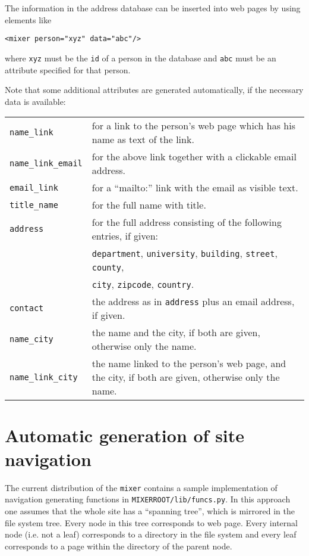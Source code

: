 \documentclass[a4paper,11pt]{article}
\newcommand{\mixer}{\texttt{mixer}}
\newcommand{\MIXERROOT}{\texttt{MIXERROOT}}
\begin{document}
The information in the address database can be inserted into web pages
by using elements like 

  \hspace*{1cm}\verb!<mixer person="xyz" data="abc"/>!

where
\verb!xyz! must be the \verb!id! of a person in the database and
\verb!abc! must be an attribute specified for that person.

Note that some additional attributes are generated automatically, if the
necessary data is available:

\hspace*{1cm}
\begin{tabular}{lp{4.3in}}
  \verb!name_link! &
    for a link to the person's web page which has his name as text of
    the link.\\
  \verb!name_link_email! &
    for the above link together with a clickable email address.\\
  \verb!email_link! &
    for a "`mailto:"' link with the email as visible text.\\
  \verb!title_name! &
    for the full name with title. \\
  \verb!address! &
    for the full address consisting of the following entries, if given:\\
    & \verb!department!, \verb!university!, \verb!building!, \verb!street!, 
      \verb!county!, \\
    & \verb!city!, \verb!zipcode!, \verb!country!. \\
  \verb!contact! &
    the address as in \verb!address! plus an email address, if given. \\
  \verb!name_city! &
    the name and the city, if both are given, otherwise only the name. \\
  \verb!name_link_city! &
    the name linked to the person's web page, and the city, if both are 
    given, otherwise only the name.
\end{tabular}


\section{Automatic generation of site navigation}
\label{autonav}

The current distribution of the {\mixer} contains a sample implementation
of navigation generating functions in \MIXERROOT\verb!/lib/funcs.py!.
In this approach one assumes that the whole site has a "`spanning tree"',
which is mirrored in the file system tree. Every node in this tree
corresponds to web page. Every internal node (i.e. not a leaf) corresponds
to a directory in the file system and every leaf corresponds to a page
within the directory of the parent node.
\end{document}
